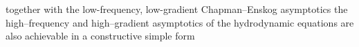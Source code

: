 together with the low-frequency, low-gradient Chapman–Enskog asymptotics the high–frequency and high–gradient asymptotics of the hydrodynamic equations are also achievable in a constructive simple form



